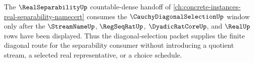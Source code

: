 The $\RealSeparabilityUp$ countable-dense handoff of
\autoref{ch:concrete-instances-real-separability-namecert} consumes the
$\CauchyDiagonalSelectionUp$ window only after the $\StreamNameUp$,
$\RegSeqRatUp$, $\DyadicRatCoreUp$, and $\RealUp$ rows have been displayed.
Thus the diagonal-selection packet supplies the finite diagonal route for the
separability consumer without introducing a quotient stream, a selected real
representative, or a choice schedule.
